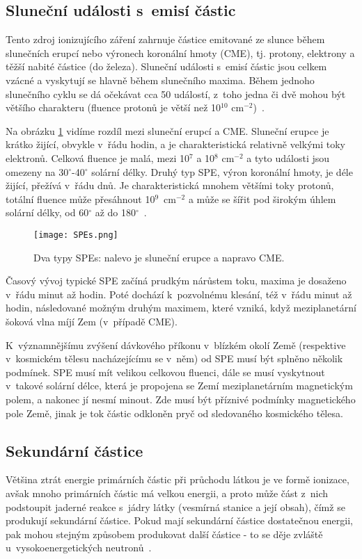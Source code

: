 \subsection{Sluneční události s~emisí částic}
Tento zdroj ionizujícího záření zahrnuje částice emitované ze slunce během slunečních erupcí nebo výronech koronální hmoty (CME), tj. protony, elektrony a těžší nabité částice (do železa). Sluneční události s~emisí částic jsou celkem vzácné a vyskytují se hlavně během slunečního maxima. Během jednoho slunečního cyklu se dá očekávat cca 50 událostí, z~toho jedna či dvě mohou být většího charakteru (fluence protonů je větší než 10$^{10}$ cm$^{-2}$)~\cite{benton}.

Na obrázku \ref{fig:SPEs} vidíme rozdíl mezi sluneční erupcí a CME. Sluneční erupce je krátko žijící, obvykle v~řádu hodin, a je charakteristická relativně velkými toky elektronů. Celková fluence je malá, mezi 10$^7$ a 10$^8$ cm$^{-2}$ a tyto události jsou omezeny na 30$^\circ$-40$^\circ$ solární délky. Druhý typ SPE, výron koronální hmoty, je déle žijící, přežívá v~řádu dnů. Je charakteristická mnohem většími toky protonů, totální fluence může přesáhnout 10$^9$~cm$^{-2}$ a může se šířit pod širokým úhlem solární délky, od 60$^\circ$ až do 180$^\circ$~\cite{benton}.

\begin{figure}[H]
  \centering
  \texttt{[image: SPEs.png]}
  \caption{Dva typy SPEs: nalevo je sluneční erupce a napravo CME. \cite{benton}}
  \label{fig:SPEs}
\end{figure}

Časový vývoj typické SPE začíná prudkým nárůstem toku, maxima je dosaženo v~řádu minut až hodin. Poté dochází k~pozvolnému klesání, též v~řádu minut až hodin, následované možným druhým maximem, které vzniká, když meziplanetární šoková vlna míjí Zem (v~případě CME).

K~významnějšímu zvýšení dávkového příkonu v~blízkém okolí Země (respektive v~kosmickém tělesu nacházejícímu se v~něm) od SPE musí být splněno několik podmínek. SPE musí mít velikou celkovou fluenci, dále se musí vyskytnout v~takové solární délce, která je propojena se Zemí meziplanetárním magnetickým polem, a nakonec jí nesmí minout. Zde musí být příznivé podmínky magnetického pole Země, jinak je tok částic odkloněn pryč od sledovaného kosmického tělesa. 
\subsection{Sekundární částice}
Většina ztrát energie primárních částic při průchodu látkou je ve formě ionizace, avšak mnoho primárních částic má velkou energii, a proto může část z~nich podstoupit jaderné reakce s~jádry látky (vesmírná stanice a její obsah), čímž se produkují sekundární částice. Pokud mají sekundární částice dostatečnou energii, pak mohou stejným způsobem produkovat další částice - to se děje zvláště u~vysokoenergetických neutronů~\cite{benton}.

